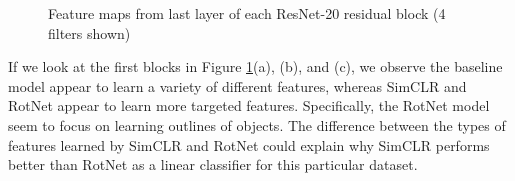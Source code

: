 \begin{figure}
\hfil 
{}\hfil
{}

\caption{Feature maps from last layer of each ResNet-20 residual block (4 filters shown)}\label{featmap}
\end{figure}


If we look at the first blocks in Figure \ref{featmap}(a), (b), and (c), we observe the baseline model appear to learn a variety of different features, whereas SimCLR and RotNet appear to learn more targeted features. Specifically, the RotNet model seem to focus on learning outlines of objects. The difference between the types of features learned by SimCLR and RotNet could explain why SimCLR performs better than RotNet as a linear classifier for this particular dataset.

